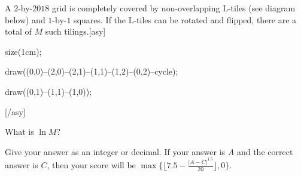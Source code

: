 A $2$-by-$2018$ grid is completely covered by non-overlapping L-tiles (see diagram below) and $1$-by-$1$ squares. If the L-tiles can be rotated and flipped, there are a total of $M$ such tilings.[asy]

size(1cm);

draw((0,0)--(2,0)--(2,1)--(1,1)--(1,2)--(0,2)--cycle);

draw((0,1)--(1,1)--(1,0));

[/asy]

What is $\ln M?$

Give your answer as an integer or decimal. If your answer is $A$ and the correct answer is $C$,  then your score will be $\max\{\lfloor7.5-\tfrac{|A-C|^{1.5}}{20}\rfloor,0\}.$